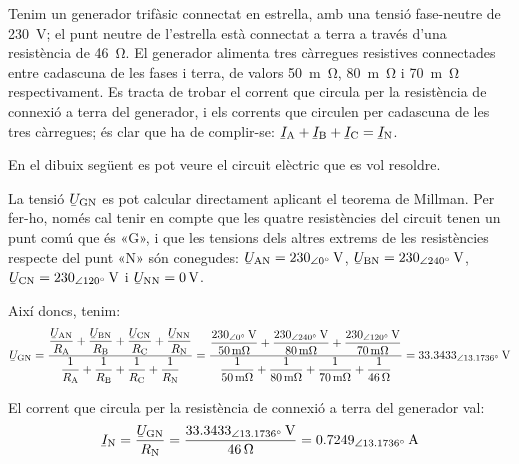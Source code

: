 \begin{exemple}\label{ex:MillmanTrifNeutre}
	\addcontentsxms{\MillmanTrifNeutre}	
    Tenim un generador trifàsic connectat en estrella, amb una tensió fase-neutre de \qty{230}{V}; el punt neutre de l'estrella està connectat a terra a través d'una resistència de \qty{46}{\ohm}. El generador alimenta tres càrregues resistives connectades entre cadascuna de les fases i terra, de valors \qty{50}{m\ohm}, \qty{80}{m\ohm} i \qty{70}{m\ohm} respectivament. Es tracta de trobar el corrent que circula per la resistència de connexió a terra del generador, i els corrents que circulen per cadascuna de les tres càrregues; és clar que ha de complir-se: $\cmplx{I}\ped{A} + \cmplx{I}\ped{B} + \cmplx{I}\ped{C} = \cmplx{I}\ped{N}$.

    En el dibuix següent es pot veure el circuit elèctric que es vol resoldre.

    \begin{center}
        
    \end{center}

    La tensió $\cmplx{U}\ped{GN}$ es pot calcular directament aplicant el teorema de Millman. Per fer-ho, només cal tenir en compte que les quatre resistències del circuit tenen un punt comú que és «G», i que les tensions dels altres extrems de les resistències respecte del punt «N» són conegudes: $\cmplx{U}\ped{AN}=\qtypd{230}{0}{V}$, $\cmplx{U}\ped{BN}=\qtypd{230}{240}{V}$, $\cmplx{U}\ped{CN}=\qtypd{230}{120}{V}$ i  $\cmplx{U}\ped{NN}=\qty{0}{V}$.

    Així doncs, tenim:
    \[
    \cmplx{U}\ped{GN} = \frac{ \dfrac{\cmplx{U}\ped{AN}}{R\ped{A}} + \dfrac{\cmplx{U}\ped{BN}}{R\ped{B}} + \dfrac{\cmplx{U}\ped{CN}}{R\ped{C}} + \dfrac{\cmplx{U}\ped{NN}}{R\ped{N}}} { \dfrac{1}{R\ped{A}} + \dfrac{1}{R\ped{B}} + \dfrac{1}{R\ped{C}} + \dfrac{1}{R\ped{N}} } =
    \frac{\dfrac{\qtypd{230}{0}{V}}{\qty{50}{m\ohm}}+\dfrac{\qtypd{230}{240}{V}}{\qty{80}{m\ohm}}+
    \dfrac{\qtypd{230}{120}{V}}{\qty{70}{m\ohm}}}{\dfrac{1}{\qty{50}{m\ohm}}+\dfrac{1}{\qty{80}{m\ohm}}+
    \dfrac{1}{\qty{70}{m\ohm}}+\dfrac{1}{\qty{46}{\ohm}}} =
    \qtypd{33,3433}{13,1736}{V}
    \]

    El corrent  que circula per la resistència de connexió a terra del generador val:
    \[
    \cmplx{I}\ped{N} = \frac{\cmplx{U}\ped{GN}}{R\ped{N}} = \frac{\qtypd{33,3433}{13,1736}{V}}{\qty{46}{\ohm}}
    = \qtypd{0,7249}{13,1736}{A}
    \]


\end{exemple}
